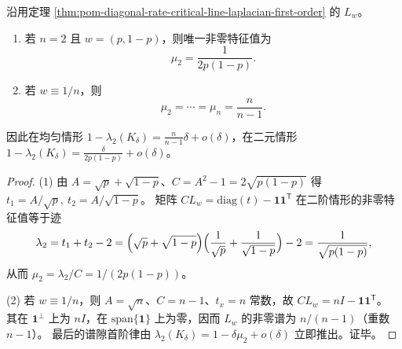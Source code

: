 

\begin{corollary}[二元与均匀分布的闭式]\label{cor:pom-diagonal-rate-critical-spectrum-binary-uniform}
沿用定理 \ref{thm:pom-diagonal-rate-critical-line-laplacian-first-order} 的 \(L_w\)。
\begin{enumerate}
  \item 若 \(n=2\) 且 \(w=(p,1-p)\)，则唯一非零特征值为
  \[
  \mu_2=\frac{1}{2p(1-p)}.
  \]
  \item 若 \(w\equiv 1/n\)，则
  \[
  \mu_2=\cdots=\mu_n=\frac{n}{n-1}.
  \]
\end{enumerate}
因此在均匀情形 \(1-\lambda_2(K_\delta)=\frac{n}{n-1}\delta+o(\delta)\)，在二元情形 \(1-\lambda_2(K_\delta)=\frac{\delta}{2p(1-p)}+o(\delta)\)。
\end{corollary}
\begin{proof}
\textup{(1)} 由 \(A=\sqrt p+\sqrt{1-p}\)、\(C=A^2-1=2\sqrt{p(1-p)}\) 得
\(
t_1=A/\sqrt p,\ t_2=A/\sqrt{1-p}
\)。
矩阵 \(CL_w=\mathrm{diag}(t)-\mathbf 1\mathbf 1^{\mathsf T}\) 在二阶情形的非零特征值等于迹
\[
\lambda_2=t_1+t_2-2
=\Bigl(\sqrt p+\sqrt{1-p}\Bigr)\Bigl(\frac{1}{\sqrt p}+\frac{1}{\sqrt{1-p}}\Bigr)-2
=\frac{1}{\sqrt{p(1-p)}},
\]
从而 \(\mu_2=\lambda_2/C=1/(2p(1-p))\)。
\par
\textup{(2)} 若 \(w\equiv 1/n\)，则 \(A=\sqrt n\)、\(C=n-1\)、\(t_x=n\) 常数，故 \(CL_w=nI-\mathbf 1\mathbf 1^{\mathsf T}\)。
其在 \(\mathbf 1^\perp\) 上为 \(nI\)，在 \(\mathrm{span}\{\mathbf 1\}\) 上为零，因而 \(L_w\) 的非零谱为 \(n/(n-1)\)（重数 \(n-1\)）。
最后的谱隙首阶律由
\(
\lambda_2(K_\delta)=1-\delta\mu_2+o(\delta)
\)
立即推出。证毕。
\end{proof}

